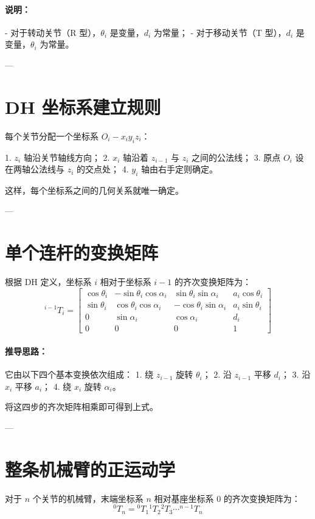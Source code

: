 \documentclass[12pt,a4paper]{article}
\begin{document}
\paragraph{说明：}
- 对于转动关节（R 型），\(\theta_i\) 是变量，\(d_i\) 为常量；
- 对于移动关节（T 型），\(d_i\) 是变量，\(\theta_i\) 为常量。

---

\section{DH 坐标系建立规则}
每个关节分配一个坐标系 $O_i-x_i y_i z_i$：

1. $z_i$ 轴沿关节轴线方向；
2. $x_i$ 轴沿着 $z_{i-1}$ 与 $z_i$ 之间的公法线；
3. 原点 $O_i$ 设在两轴公法线与 $z_i$ 的交点处；
4. $y_i$ 轴由右手定则确定。

这样，每个坐标系之间的几何关系就唯一确定。

---

\section{单个连杆的变换矩阵}
根据 DH 定义，坐标系 $i$ 相对于坐标系 $i-1$ 的齐次变换矩阵为：
\[
^{i-1}T_i =
\begin{bmatrix}
\cos\theta_i & -\sin\theta_i\cos\alpha_i & \sin\theta_i\sin\alpha_i & a_i\cos\theta_i\\
\sin\theta_i & \cos\theta_i\cos\alpha_i & -\cos\theta_i\sin\alpha_i & a_i\sin\theta_i\\
0 & \sin\alpha_i & \cos\alpha_i & d_i\\
0 & 0 & 0 & 1
\end{bmatrix}
\]

\paragraph{推导思路：}
它由以下四个基本变换依次组成：
1. 绕 $z_{i-1}$ 旋转 $\theta_i$；
2. 沿 $z_{i-1}$ 平移 $d_i$；
3. 沿 $x_i$ 平移 $a_i$；
4. 绕 $x_i$ 旋转 $\alpha_i$。

\noindent
将这四步的齐次矩阵相乘即可得到上式。

---

\section{整条机械臂的正运动学}
对于 $n$ 个关节的机械臂，末端坐标系 $n$ 相对基座坐标系 $0$ 的齐次变换矩阵为：
\[
^{0}T_n = {^{0}T_1} {^{1}T_2} {^{2}T_3} \cdots {^{n-1}T_n}
\]
\end{document}
